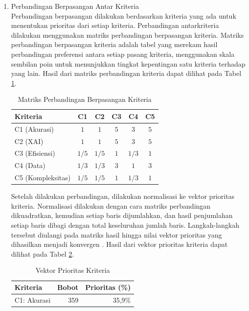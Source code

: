 \begin{enumerate}
\begin{enumerate}
\begin{enumerate}
		\end{enumerate}
	\end{enumerate}
	\item Perbandingan Berpasangan Antar Kriteria \\
	Perbandingan berpasangan dilakukan berdasarkan kriteria yang ada untuk menentukan prioritas dari setiap kriteria. Perbandingan antarkriteria dilakukan menggunakan matriks perbandingan berpasangan kriteria. Matriks perbandingan berpasangan kriteria adalah tabel yang merekam hasil perbandingan preferensi antara setiap pasang kriteria, menggunakan skala sembilan poin untuk menunjukkan tingkat kepentingan satu kriteria terhadap yang lain. Hasil dari matriks perbandingan kriteria dapat dilihat pada Tabel \ref{tab:perbandingan_kriteria}.
	\begin{table}[H]
		\centering
		\caption{Matriks Perbandingan Berpasangan Kriteria}
		\label{tab:perbandingan_kriteria}
		\begin{tabular}{|l|c|c|c|c|c|}
			\hline
			Kriteria & C1 & C2 & C3 & C4 & C5 \\ \hline
			C1 (Akurasi) & $1$ & $1$ & $5$ & $3$ & $5$ \\ \hline
			C2 (XAI) & $1$ & $1$ & $5$ & $3$ & $5$ \\ \hline
			C3 (Efisiensi) & $1/5$ & $1/5$ & $1$ & $1/3$ & $1$ \\ \hline
			C4 (Data) & $1/3$ & $1/3$ & $3$ & $1$ & $3$ \\ \hline
			C5 (Kompleksitas) & $1/5$ & $1/5$ & $1$ & $1/3$ & $1$ \\ \hline
		\end{tabular}
	\end{table}
	Setelah dilakukan perbandingan, dilakukan normalisasi ke vektor prioritas kriteria. Normalisasi dilakukan dengan cara matriks perbandingan dikuadratkan, kemudian setiap baris dijumlahkan, dan hasil penjumlahan setiap baris dibagi dengan total keseluruhan jumlah baris. Langkah-langkah tersebut diulangi pada matriks hasil hingga nilai vektor prioritas yang dihasilkan menjadi konvergen \textcite{1000minds2025ahp}. Hasil dari vektor prioritas kriteria dapat dilihat pada Tabel \ref{tab:prioritas_kriteria}.
	\begin{table}[h]
		\centering
		\caption{Vektor Prioritas Kriteria}
		\label{tab:prioritas_kriteria}
		\begin{tabular}{|l|r|r|}
			\hline
			Kriteria & Bobot & Prioritas (\%) \\ \hline
			C1: Akurasi & 359 & 35,9\% \\ \hline

\end{tabular}
\end{table}
\end{enumerate}
